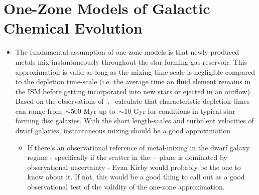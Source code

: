 \documentclass[ms.tex]{subfiles}
\begin{document}
\section{One-Zone Models of Galactic Chemical Evolution}
\label{sec:onezone}

\begin{itemize}

	\item The fundamental assumption of one-zone models is that newly produced
	metals mix instantaneously throughout the star forming gas reservoir.
	This approximation is valid as long as the mixing time-scale is negligible
	compared to the depletion time-scale (i.e. the average time an fluid
	element remains in the ISM before getting incorporated into new stars or
	ejected in an outflow).
	Based on the observations of~\citet{Leroy2008},~\citet*{Weinberg2017}
	calculate that characteristic depletion times can range from~$\sim$500 Myr
	up to~$\sim$10 Gyr for conditions in typical star forming disc galaxies.
	With the short length-scales and turbulent velocities of dwarf galaxies,
	instantaneous mixing should be a good approximation

	\begin{itemize}
		\item {\color{red}
		If there's an observational reference of metal-mixing in the dwarf
		galaxy regime - specifically if the scatter in the~\afe-\feh~plane is
		dominated by observational uncertainty - Evan Kirby would probably be
		the one to know about it.
		If not, this would be a good thing to call out as a good observational
		test of the validity of the one-zone approximation.
		}
	\end{itemize}

\end{itemize}
\end{document}
